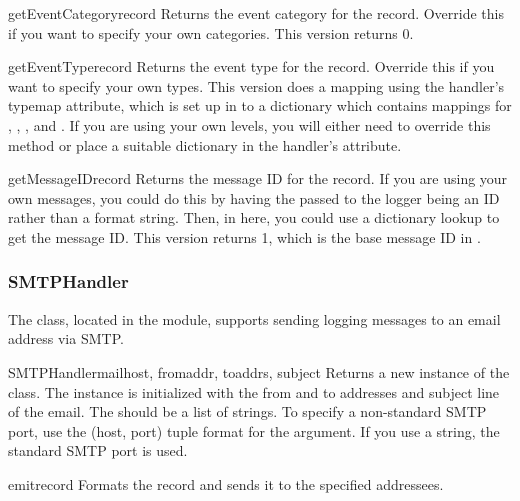 \begin{methoddesc}{getEventCategory}{record}
Returns the event category for the record. Override this if you
want to specify your own categories. This version returns 0.
\end{methoddesc}

\begin{methoddesc}{getEventType}{record}
Returns the event type for the record. Override this if you want
to specify your own types. This version does a mapping using the
handler's typemap attribute, which is set up in 
to a dictionary which contains mappings for ,
, ,  and
. If you are using your own levels, you will either need
to override this method or place a suitable dictionary in the
handler's  attribute.
\end{methoddesc}

\begin{methoddesc}{getMessageID}{record}
Returns the message ID for the record. If you are using your
own messages, you could do this by having the  passed to the
logger being an ID rather than a format string. Then, in here,
you could use a dictionary lookup to get the message ID. This
version returns 1, which is the base message ID in
.
\end{methoddesc}

\subsubsection{SMTPHandler}

The  class, located in the
 module, supports sending logging messages to
an email address via SMTP.

\begin{classdesc}{SMTPHandler}{mailhost, fromaddr, toaddrs, subject}
Returns a new instance of the  class. The
instance is initialized with the from and to addresses and subject
line of the email. The  should be a list of strings. To specify a
non-standard SMTP port, use the (host, port) tuple format for the
 argument. If you use a string, the standard SMTP port
is used.
\end{classdesc}

\begin{methoddesc}{emit}{record}
Formats the record and sends it to the specified addressees.
\end{methoddesc}

